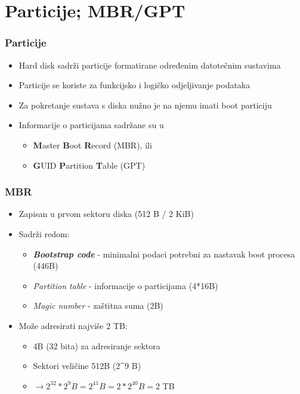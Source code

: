 \documentclass[t]{beamer}
\begin{document}
\section{Particije; MBR/GPT}
\begin{frame}
	\frametitle{Particije}
	\begin{itemize}
		\item Hard disk sadrži particije formatirane određenim datotečnim sustavima
		\item Particije se koriste za funkcijsko i logičko odjeljivanje podataka
		\item Za pokretanje sustava s diska nužno je na njemu imati boot particiju
		\item Informacije o particijama sadržane su u
		\begin{itemize}
			\item \textbf{M}aster \textbf{B}oot \textbf{R}ecord (MBR), ili
			\item \textbf{G}UID \textbf{P}artition \textbf{T}able (GPT)
		\end{itemize}
	\end{itemize}
\end{frame}	





\begin{frame}
	\frametitle{MBR}
	\begin{itemize}
		\item Zapisan u prvom sektoru diska (512 B / 2 KiB)
		\item Sadrži redom:
		\begin{itemize}
			\item \textit{\textbf{Bootstrap code}} - minimalni podaci potrebni za nastavak boot procesa (446B)
			\item \textit{Partition table} - informacije o particijama (4*16B)
			\item \textit{Magic number} - zaštitna suma (2B)
		\end{itemize}
		\item Može adresirati najviše 2 TB:
		\begin{itemize}
			\item 4B (32 bita) za adresiranje sektora
			\item Sektori veličine 512B (2\textasciicircum{9} B)
			\item $\longrightarrow{2}^{32}*{2}^{9}B={2}^{41}B=2*{2}^{40}B=$2 TB
		\end{itemize}
	\end{itemize}
\end{frame}
\end{document}
